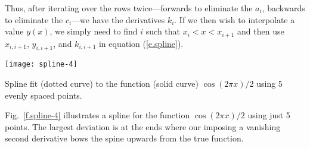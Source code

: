 Thus, after iterating over the rows twice---forwards to eliminate the $a_{i}$, backwards to eliminate the $c_{i}$---we have the derivatives $k_{i}$. If we then wish to interpolate a value $y(x)$, we simply need to find $i$ such that $x_{i}< x < x_{i+1}$ and then use $x_{i,i+1}$, $y_{i,i+1}$, and $k_{i,i+1}$ in equation (\ref{e.spline}).

\begin{marginfigure}
\texttt{[image: spline-4]}
\caption{\label{f.spline-4} Spline fit (dotted curve) to the function (solid curve) $\cos(2\pi x)/2$ using 5 evenly spaced points.}
\end{marginfigure}
Fig.~\ref{f.spline-4} illustrates a spline for the function $\cos(2\pi x)/2$ using just 5 points. The largest deviation is at the ends where our imposing a vanishing second derivative bows the spine upwards from the true function.
